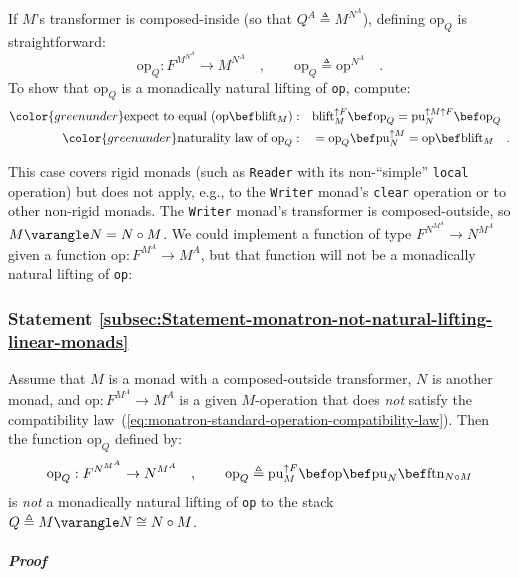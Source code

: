 If $M$\textsf{'}s transformer is composed-inside (so that $Q^{A}\triangleq M^{N^{A}}$),
defining $\text{op}_{Q}$ is straightforward:
\[
\text{op}_{Q}:F^{M^{N^{A}}}\rightarrow M^{N^{A}}\quad,\quad\quad\text{op}_{Q}\triangleq\text{op}^{N^{A}}\quad.
\]
To show that $\text{op}_{Q}$ is a monadically natural lifting of
\lstinline!op!, compute:
\begin{align*}
{\color{greenunder}\text{expect to equal }(\text{op}\bef\text{blift}_{M}):}\quad & \text{blift}_{M}^{\uparrow F}\bef\text{op}_{Q}=\text{pu}_{N}^{\uparrow M\uparrow F}\bef\text{op}_{Q}\\
{\color{greenunder}\text{naturality law of }\text{op}_{Q}:}\quad & =\text{op}_{Q}\bef\text{pu}_{N}^{\uparrow M}=\text{op}\bef\text{blift}_{M}\quad.
\end{align*}

This case covers rigid monads (such as \lstinline!Reader! with its
non-\textsf{``}simple\textsf{''} \lstinline!local! operation) but does not apply,
e.g., to the \lstinline!Writer! monad\textsf{'}s \lstinline!clear! operation
or to other non-rigid monads. The \lstinline!Writer! monad\textsf{'}s transformer
is composed-outside, so $M\varangle N=N\circ M$. We could implement
a function of type $F^{N^{M^{A}}}\rightarrow N^{M^{A}}$given a function
$\text{op}:F^{M^{A}}\rightarrow M^{A}$, but that function will not
be a monadically natural lifting of \lstinline!op!:

\subsubsection{Statement \label{subsec:Statement-monatron-not-natural-lifting-linear-monads}\ref{subsec:Statement-monatron-not-natural-lifting-linear-monads}}

Assume that $M$ is a monad with a composed-outside transformer, $N$
is another monad, and $\text{op}:F^{M^{A}}\rightarrow M^{A}$ is a
given $M$-operation that does \emph{not} satisfy the compatibility
law~(\ref{eq:monatron-standard-operation-compatibility-law}). Then
the function $\text{op}_{Q}$ defined by:
\[
\text{op}_{Q}:F^{N^{M^{A}}}\rightarrow N^{M^{A}}\quad,\quad\quad\text{op}_{Q}\triangleq\text{pu}_{M}^{\uparrow F}\bef\text{op}\bef\text{pu}_{N}\bef\text{ftn}_{N\circ M}
\]
is \emph{not} a monadically natural lifting of \lstinline!op! to
the stack $Q\triangleq M\varangle N\cong N\circ M$.

\subparagraph{Proof}

